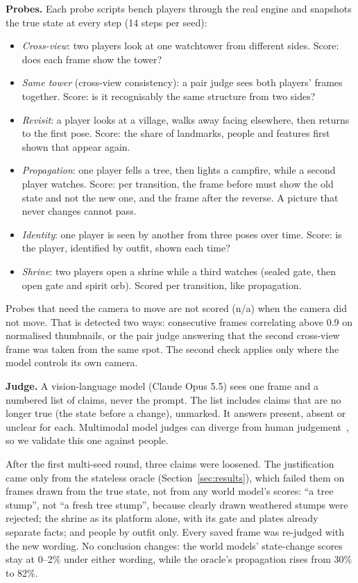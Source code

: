\documentclass[conference]{IEEEtran}
\begin{document}
\textbf{Probes.} Each probe scripts bench players through the real engine and snapshots the true state at every step (14 steps per seed):
\begin{itemize}
\item \emph{Cross-view}: two players look at one watchtower from different sides. Score: does each frame show the tower?
\item \emph{Same tower} (cross-view consistency): a pair judge sees both players' frames together. Score: is it recognisably the same structure from two sides?
\item \emph{Revisit}: a player looks at a village, walks away facing elsewhere, then returns to the first pose. Score: the share of landmarks, people and features first shown that appear again.
\item \emph{Propagation}: one player fells a tree, then lights a campfire, while a second player watches. Score: per transition, the frame before must show the old state and not the new one, and the frame after the reverse. A picture that never changes cannot pass.
\item \emph{Identity}: one player is seen by another from three poses over time. Score: is the player, identified by outfit, shown each time?
\item \emph{Shrine}: two players open a shrine while a third watches (sealed gate, then open gate and spirit orb). Scored per transition, like propagation.
\end{itemize}

Probes that need the camera to move are not scored (n/a) when the camera did not move. That is detected two ways: consecutive frames correlating above 0.9 on normalised thumbnails, or the pair judge answering that the second cross-view frame was taken from the same spot. The second check applies only where the model controls its own camera.

\textbf{Judge.} A vision-language model (Claude Opus 5.5) sees one frame and a numbered list of claims, never the prompt. The list includes claims that are no longer true (the state before a change), unmarked. It answers present, absent or unclear for each. Multimodal model judges can diverge from human judgement~\cite{mllmjudge}, so we validate this one against people.

After the first multi-seed round, three claims were loosened. The justification came only from the stateless oracle (Section~\ref{sec:results}), which failed them on frames drawn from the true state, not from any world model's scores: ``a tree stump'', not ``a fresh tree stump'', because clearly drawn weathered stumps were rejected; the shrine as its platform alone, with its gate and plates already separate facts; and people by outfit only. Every saved frame was re-judged with the new wording. No conclusion changes: the world models' state-change scores stay at 0--2\% under either wording, while the oracle's propagation rises from 30\% to 82\%.
\end{document}
